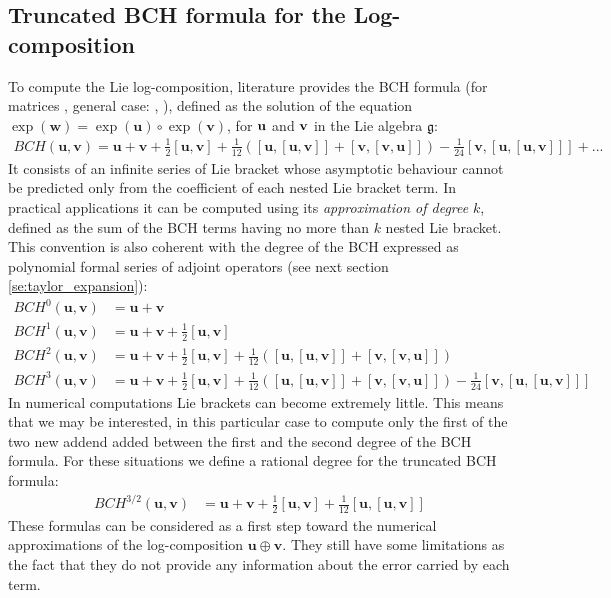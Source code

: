 \subsection{Truncated BCH formula for the Log-composition}\label{se:bch_formula}

To compute the Lie log-composition, literature provides the BCH formula (for matrices \cite{hall2015lie}, general case: \cite{klarsfeld1989baker} , \cite{serre2009lie}), defined as the solution of the equation $\exp(\mathbf{w}) = \exp(\mathbf{u}) \circ \exp(\mathbf{v})$, for $\bf{u}$ and $\bf{v}$ in the Lie algebra $\mathfrak{g}$:
\begin{align}\label{eq:bch_definition}
	BCH(\mathbf{u},\mathbf{v}) 
	= 
	\mathbf{u} + \mathbf{v} + \frac{1}{2}[\mathbf{u},\mathbf{v}] + \frac{1}{12}([\mathbf{u},[\mathbf{u},\mathbf{v}]]
	+ [\mathbf{v},[\mathbf{v},\mathbf{u}]]) - \frac{1}{24}[\mathbf{v},[\mathbf{u},[\mathbf{u},\mathbf{v}]]] +... 
\end{align}
It consists of an infinite series of Lie bracket whose asymptotic behaviour cannot be predicted only from the coefficient of each nested Lie bracket term. In practical applications it can be computed using its \emph{approximation of degree} $k$, defined as the sum of the BCH terms having no more than $k$ nested Lie bracket. This convention is also coherent with the degree of the BCH expressed as polynomial formal series of adjoint operators (see next section \ref{se:taylor_expansion}):
\begin{align*}
BCH^{0}(\mathbf{u},\mathbf{v}) &= \mathbf{u} + \mathbf{v} \\
BCH^{1}(\mathbf{u},\mathbf{v}) &=  \mathbf{u} + \mathbf{v} + \frac{1}{2}[\mathbf{u},\mathbf{v}] \\
BCH^{2}(\mathbf{u},\mathbf{v}) &=  \mathbf{u} + \mathbf{v} + \frac{1}{2}[\mathbf{u},\mathbf{v}] + \frac{1}{12}([\mathbf{u},[\mathbf{u},\mathbf{v}]] + [\mathbf{v},[\mathbf{v},\mathbf{u}]]) \\
BCH^{3}(\mathbf{u},\mathbf{v}) &=  \mathbf{u} + \mathbf{v} + \frac{1}{2}[\mathbf{u},\mathbf{v}] + \frac{1}{12}([\mathbf{u},[\mathbf{u},\mathbf{v}]] + [\mathbf{v},[\mathbf{v},\mathbf{u}]])- \frac{1}{24}[\mathbf{v},[\mathbf{u},[\mathbf{u},\mathbf{v}]]] 
\end{align*}
In numerical computations Lie brackets can become extremely little. This means that we may be interested, in this particular case to compute only the first of the two new addend added between the first and the second degree of the BCH formula. For these situations we define a rational degree for the truncated BCH formula:
\begin{align*}
BCH^{3/2}(\mathbf{u},\mathbf{v}) &=  \mathbf{u} + \mathbf{v} + \frac{1}{2}[\mathbf{u},\mathbf{v}] + \frac{1}{12}[\mathbf{u},[\mathbf{u},\mathbf{v}]]
\end{align*}
These formulas can be considered as a first step toward the numerical approximations of the log-composition $\mathbf{u}\oplus \mathbf{v}$. They still have some limitations as the fact that they do not provide any information about the error carried by each term.



